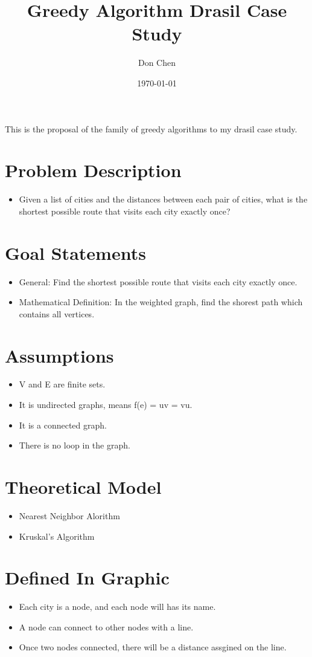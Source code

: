 \documentclass[12pt]{article}
\title{Greedy Algorithm Drasil Case Study}
\author{Don Chen}
\date{\today}
\begin{document}
\maketitle
This is the proposal of the family of greedy algorithms to my drasil case study.

\section{Problem Description}
\begin{itemize}
    \item Given a list of cities and the distances between each pair of cities, 
    what is the shortest possible route that visits each city exactly once?
\end{itemize}

\section{Goal Statements}
\begin{itemize}
    \item General: Find the shortest possible route that visits each city exactly once.
    \item Mathematical Definition: In the weighted graph, find the shorest path which contains all vertices.
\end{itemize}

\section{Assumptions}
\begin{itemize}
    \item V and E are finite sets.
    \item It is undirected graphs, means f(e) = uv = vu.
    \item It is a connected graph.
    \item There is no loop in the graph.
\end{itemize}

\section{Theoretical Model}
\begin{itemize}
    \item Nearest Neighbor Alorithm
    \item Kruskal’s Algorithm
\end{itemize}

\section{Defined In Graphic}
\begin{itemize}
    \item Each city is a node, and each node will has its name.
    \item A node can connect to other nodes with a line.
    \item Once two nodes connected, there will be a distance assgined on the line.
\end{itemize}
\end{document}
